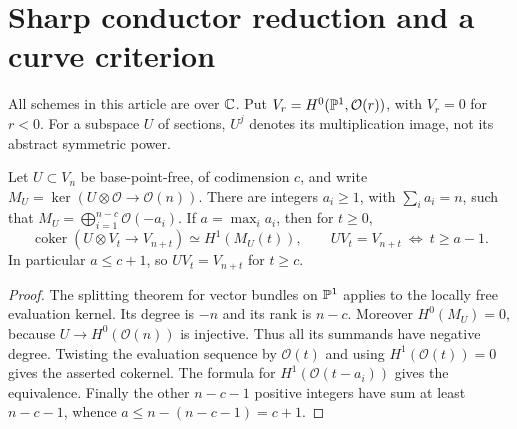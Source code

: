 \section{Sharp conductor reduction and a curve criterion}
\label{sec:sharp-conductor}
All schemes in this article are over $\mathbb C$. Put $V_r=H^0(\mathbb P^1,\mathcal O(r))$,
with $V_r=0$ for $r<0$. For a subspace $U$ of sections, $U^j$ denotes
its multiplication image, not its abstract symmetric power.

\begin{lemma}\label{lem:sharp-kernel}
Let $U\subset V_n$ be base-point-free, of codimension $c$, and write
$M_U=\ker(U\otimes\mathcal O\to\mathcal O(n))$.
There are integers $a_i\ge1$, with $\sum_i a_i=n$, such that
$M_U=\bigoplus_{i=1}^{n-c}\mathcal O(-a_i)$. If $a=\max_i a_i$, then
for $t\ge0$,
\[
 \operatorname{coker}(U\otimes V_t\to V_{n+t})
       \simeq H^1(M_U(t)),\qquad
 UV_t=V_{n+t}\ \Longleftrightarrow\ t\ge a-1.
\]
In particular $a\le c+1$, so $UV_t=V_{n+t}$ for $t\ge c$.
\end{lemma}
\begin{proof}
The splitting theorem for vector bundles on $\mathbb P^1$ applies to the
locally free evaluation kernel. Its degree is $-n$ and its rank is
$n-c$. Moreover $H^0(M_U)=0$, because $U\to H^0(\mathcal O(n))$ is
injective. Thus all its summands have negative degree. Twisting the
evaluation sequence by $\mathcal O(t)$ and using $H^1(\mathcal O(t))=0$
gives the asserted cokernel. The formula for $H^1(\mathcal O(t-a_i))$
gives the equivalence. Finally the other $n-c-1$ positive integers
have sum at least $n-c-1$, whence $a\le n-(n-c-1)=c+1$.
\end{proof}

